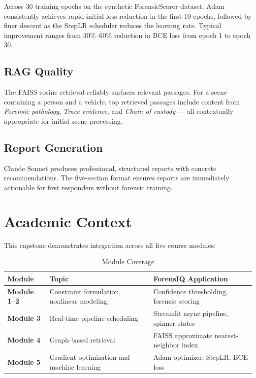 \documentclass[12pt,a4paper]{article}
\begin{document}
Across 30 training epochs on the synthetic ForensicScorer dataset, Adam
consistently achieves rapid initial loss reduction in the first 10 epochs,
followed by finer descent as the StepLR scheduler reduces the learning rate.
Typical improvement ranges from 30\%--60\% reduction in BCE loss from epoch 1
to epoch 30.

\subsection{RAG Quality}

The FAISS cosine retrieval reliably surfaces relevant passages. For a scene
containing a person and a vehicle, top retrieved passages include content from
\textit{Forensic pathology}, \textit{Trace evidence}, and \textit{Chain of
custody} — all contextually appropriate for initial scene processing.

\subsection{Report Generation}

Claude Sonnet produces professional, structured reports with concrete
recommendations. The five-section format ensures reports are immediately
actionable for first responders without forensic training.

\section{Academic Context}

This capstone demonstrates integration across all five course modules:

\begin{table}[h!]
  \centering
  \caption{Module Coverage}
  \begin{tabular}{>{\bfseries}p{2.5cm} p{5.5cm} p{5.5cm}}
    \toprule
    \textbf{Module} & \textbf{Topic} & \textbf{ForensIQ Application} \\
    \midrule
    Module 1--2 & Constraint formulation, nonlinear modeling
                & Confidence thresholding, forensic scoring \\[4pt]
    Module 3    & Real-time pipeline scheduling
                & Streamlit async pipeline, spinner states \\[4pt]
    Module 4    & Graph-based retrieval
                & FAISS approximate nearest-neighbor index \\[4pt]
    Module 5    & Gradient optimization and machine learning
                & Adam optimizer, StepLR, BCE loss \\
    \bottomrule
  \end{tabular}
\end{table}
\end{document}

